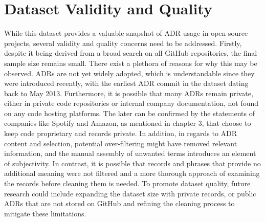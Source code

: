     \section{Dataset Validity and Quality}
    While this dataset provides a valuable snapshot of ADR usage in open-source projects, several validity and quality concerns need to be addressed. Firstly, despite it being derived from a broad search on all GitHub repositories, the final sample size remains small. There exist a plethora of reasons for why this may be observed. ADRs are not yet widely adopted, which is understandable since they were introduced recently, with the earliest ADR commit in the dataset dating back to May 2013. Furthermore, it is possible that many ADRs remain private, either in private code repositories or internal company documentation, not found on any code hosting platforms. The later can be confirmed by the statements of companies like Spotify and Amazon, as mentioned in chapter 3, that choose to keep code proprietary and records private.
    In addition, in regards to ADR content and selection, potential over-filtering might have removed relevant information, and the manual assembly of unwanted terms introduces an element of subjectivity. In contrast, it is possible that records and phrases that provide no additional meaning were not filtered and a more thorough approach of examining the records before cleaning them is needed. To promote dataset quality, future research could include expanding the dataset size with private records, or public ADRs that are not stored on GitHub and refining the cleaning process to mitigate these limitations.